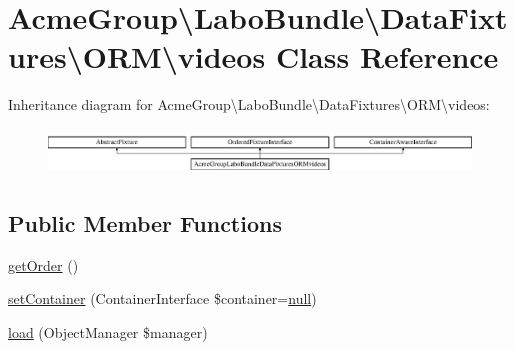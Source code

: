 \hypertarget{class_acme_group_1_1_labo_bundle_1_1_data_fixtures_1_1_o_r_m_1_1videos}{\section{Acme\+Group\textbackslash{}Labo\+Bundle\textbackslash{}Data\+Fixtures\textbackslash{}O\+R\+M\textbackslash{}videos Class Reference}
\label{class_acme_group_1_1_labo_bundle_1_1_data_fixtures_1_1_o_r_m_1_1videos}
}
Inheritance diagram for Acme\+Group\textbackslash{}Labo\+Bundle\textbackslash{}Data\+Fixtures\textbackslash{}O\+R\+M\textbackslash{}videos\+:\begin{figure}[H]
\begin{center}
\leavevmode
\includegraphics[height=1.216069cm]{class_acme_group_1_1_labo_bundle_1_1_data_fixtures_1_1_o_r_m_1_1videos}
\end{center}
\end{figure}
\subsection*{Public Member Functions}
\begin{DoxyCompactItemize}
\item 
\hyperlink{class_acme_group_1_1_labo_bundle_1_1_data_fixtures_1_1_o_r_m_1_1videos_a9762b5b3434bd59995f1d59fbb60a084}{get\+Order} ()
\item 
\hyperlink{class_acme_group_1_1_labo_bundle_1_1_data_fixtures_1_1_o_r_m_1_1videos_a1a127793aa694779413ef451e5650d7f}{set\+Container} (Container\+Interface \$container=\hyperlink{validate_8js_afb8e110345c45e74478894341ab6b28e}{null})
\item 
\hyperlink{class_acme_group_1_1_labo_bundle_1_1_data_fixtures_1_1_o_r_m_1_1videos_a647fac18272d372d4d2586896034602e}{load} (Object\+Manager \$manager)
\end{DoxyCompactItemize}


